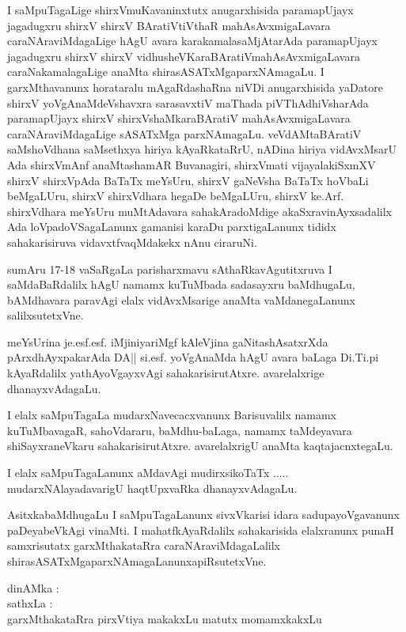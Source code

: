 I saMpuTagaLige shirxVmuKavaninxtutx anugarxhisida paramapUjayx jagadugxru shirxV shirxV BAratiVtiVthaR mahAsAvxmigaLavara caraNAraviMdagaLige hAgU avara karakamalasaMjAtarAda paramapUjayx jagadugxru shirxV shirxV vidhusheVKaraBAratiV\break mahAsAvxmigaLavara caraNakamalagaLige anaMta shirasASATxMgaparxNAmagaLu. I garxMthavanunx horataralu mAgaRdashaRna niVDi anugarxhisida yaDatore shirxV yoVgAnaMdeVshavxra sarasavxtiV maThada piVThAdhiVsharAda paramapUjayx shirxV shirxV\break shaMkaraBAratiV mahAsAvxmigaLavara caraNAraviMdagaLige sASATxMga parxNAmagaLu. veVdAMtaBAratiV saMshoVdhana saMsethxya hiriya kAyaRkataRrU, nADina hiriya vidAvxMsarU Ada shirxVmAnf anaMtashamAR Buvanagiri, shirxVmati vijayalakiSxmXV shirxV shirxVpAda BaTaTx meYsUru, shirxV gaNeVsha BaTaTx hoVbaLi beMgaLUru, shirxV shirxVdhara hegaDe beMgaLUru, shirxV ke.Arf. shirxVdhara meYsUru muMtAdavara sahakAradoMdige akaSxravinAyxsadalilx Ada loVpadoVSagaLanunx gamanisi karaDu parxtigaLanunx tididx sahakarisiruva vidavxtfvaqMdakekx nAnu ciraruNi. 

sumAru 17-18 vaSaRgaLa parisharxmavu sAthaRkavAgutitxruva I saMdaBaRdalilx hAgU namamx kuTuMbada sadasayxru baMdhugaLu, bAMdhavara paravAgi elalx vidAvxMsarige anaMta vaMdanegaLanunx salilxsutetxVne. 

meYsUrina je.esf.esf. iMjiniyariMgf kAleVjina gaNitashAsatxrXda pArxdhAyxpakarAda DA|| si.esf. yoVgAnaMda hAgU avara baLaga Di.Ti.pi kAyaRdalilx yathAyoVgayxvAgi sahakarisirutAtxre. avarelalxrige dhanayxvAdagaLu. 

I elalx saMpuTagaLa mudarxNavecacxvanunx Barisuvalilx namamx kuTuMbavagaR, sahoVdararu, baMdhu-baLaga, namamx taMdeyavara shiSayxraneVkaru sahakarisirutAtxre. avarelalxrigU anaMta kaqtajacnxtegaLu. 

I elalx saMpuTagaLanunx aMdavAgi mudirxsikoTaTx ..... mudarxNAlayadavarigU haqtUpxvaRka dhanayxvAdagaLu.

AsitxkabaMdhugaLu I saMpuTagaLanunx sivxVkarisi idara sadupayoVgavanunx paDeyabeVkAgi vinaMti. I mahatfkAyaRdalilx sahakarisida elalxranunx punaH samxrisutatx garxMthakataRra caraNAraviMdagaLalilx shirasASATxMgaparxNAmagaLanunx\break apiRsutetxVne.

\bigskip

\noindent dinAMka : \\
sathxLa : \\
garxMthakataRra pirxVtiya makakxLu matutx momamxkakxLu
